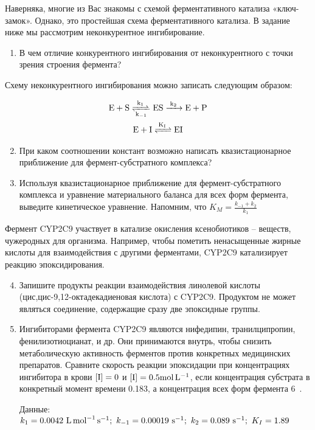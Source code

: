 
Наверняка, многие из Вас знакомы с схемой ферментативного катализа «ключ-замок». Однако, это простейшая схема ферментативного катализа. В задание ниже мы рассмотрим неконкурентное ингибирование.

\begin{enumerate}
    \item В чем отличие конкурентного ингибирования от неконкурентного с точки зрения строения фермента?
\end{enumerate}

Схему неконкурентного ингибирования можно записать следующим образом:

\begin{gather*}
    \ce{E + S <=>[k_1][k_{-1}] ES ->[k_2] E + P} \\
    \ce{E + I <=>[K_I] EI}
\end{gather*}

\begin{enumerate}
    \setcounter{enumi}{1}
    \item При каком соотношении констант возможно написать квазистационарное приближение для фермент-субстратного комплекса?
    
    \item Используя квазистационарное приближение для фермент-субстратного комплекса и уравнение материального баланса для всех форм фермента, выведите кинетическое уравнение. Напомним, что $\displaystyle K_M = \frac{k_{-1} + k_2}{k_1}$
\end{enumerate}

Фермент CYP2C9 участвует в катализе окисления ксенобиотиков – веществ, чужеродных для организма. Например, чтобы пометить ненасыщенные жирные кислоты для взаимодействия с другими ферментами, CYP2C9 катализирует реакцию эпоксидирования.

\begin{enumerate}
    \setcounter{enumi}{3}
    \item Запишите продукты реакции взаимодействия линолевой кислоты (цис,цис-9,12-октадекадиеновая кислота) с CYP2C9. Продуктом не может являться соединение, содержащие сразу две эпоксидные группы.
    
    \item Ингибиторами фермента CYP2C9 являются нифедипин, транилципропин, фенилизотиоцианат, и др. Они принимаются внутрь, чтобы снизить метаболическую активность ферментов против конкретных медицинских препаратов. Сравните скорость реакции эпоксидации при концентрациях ингибитора в крови $[\ce{I}] = 0$ и $[\ce{I}] = 0.5\unit{\moll}$, если
    концентрация субстрата в конкретный момент времени 0.183\unit{\moll}, а концентрация всех форм фермента 6\unit{\milli\moll}.
    
    Данные: $k_1 = 0.0042~\unit{\lmols}; \ k_{-1} = 0.00019~\unit{\per\second}; \ k_2 = 0.089~\unit{\per\second}; \ K_I = 1.89$
\end{enumerate}